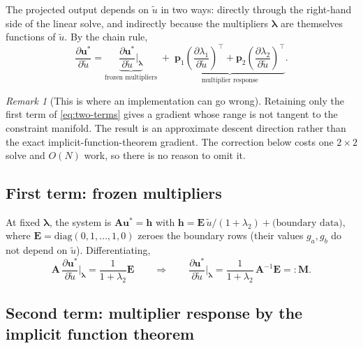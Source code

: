 \documentclass[11pt,a4paper]{article}
\theoremstyle{remark}
\newtheorem{remark}{Remark}
\newcommand{\ut}{\tilde{u}}
\newcommand{\us}{u^{*}}
\begin{document}
The projected output depends on $\ut$ in two ways: directly through the
right-hand side of the linear solve, and indirectly because the multipliers
$\bm\lambda$ are themselves functions of $\ut$. By the chain rule,
\begin{equation}
\frac{\partial\bm{\us}}{\partial\ut}
= \underbrace{\frac{\partial\bm{\us}}{\partial\ut}\bigg|_{\bm\lambda}}_{\text{frozen multipliers}}
\;+\;
\underbrace{\bm{p}_1\left(\frac{\partial\lambda_1}{\partial\ut}\right)^{\!\top}
+ \bm{p}_2\left(\frac{\partial\lambda_2}{\partial\ut}\right)^{\!\top}}_{\text{multiplier response}} .
\label{eq:two-terms}
\end{equation}

\begin{remark}[This is where an implementation can go wrong]
Retaining only the first term of \eqref{eq:two-terms} gives a gradient whose
range is not tangent to the constraint manifold. The result is an approximate
descent direction rather than the exact implicit-function-theorem gradient.
The correction below costs one $2\times2$ solve and $O(N)$ work, so there is no
reason to omit it.
\end{remark}

\subsection{First term: frozen multipliers}

At fixed $\bm\lambda$, the system is $\bm{A}\bm{\us} = \bm{h}$ with
$\bm{h} = \bm{E}\,\ut/(1+\lambda_2) + \text{(boundary data)}$, where
$\bm{E} = \mathrm{diag}(0,1,\dots,1,0)$ zeroes the boundary rows (their values
$g_a, g_b$ do not depend on $\ut$). Differentiating,
\begin{equation}
\bm{A}\,\frac{\partial\bm{\us}}{\partial\ut}\bigg|_{\bm\lambda} = \frac{1}{1+\lambda_2}\bm{E}
\qquad\Longrightarrow\qquad
\frac{\partial\bm{\us}}{\partial\ut}\bigg|_{\bm\lambda}
= \frac{1}{1+\lambda_2}\,\bm{A}^{-1}\bm{E} =: \bm{M} .
\label{eq:M}
\end{equation}

\subsection{Second term: multiplier response by the implicit function theorem}
\end{document}
